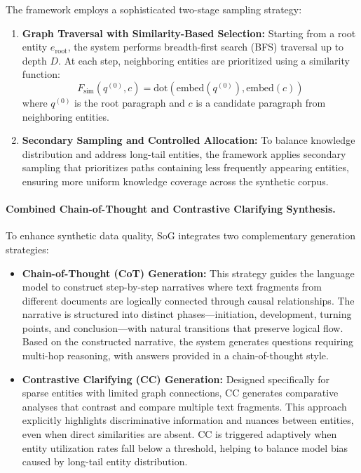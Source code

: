 \documentclass[11pt,a4paper]{article}
\begin{document}
The framework employs a sophisticated two-stage sampling strategy:
\begin{enumerate}
    \item \textbf{Graph Traversal with Similarity-Based Selection:} Starting from a root entity $e_{\text{root}}$, the system performs breadth-first search (BFS) traversal up to depth $D$. At each step, neighboring entities are prioritized using a similarity function:
    \begin{equation}
    F_{\text{sim}}(q^{(0)}, c) = \text{dot}(\text{embed}(q^{(0)}), \text{embed}(c))
    \end{equation}
    where $q^{(0)}$ is the root paragraph and $c$ is a candidate paragraph from neighboring entities.
    
    \item \textbf{Secondary Sampling and Controlled Allocation:} To balance knowledge distribution and address long-tail entities, the framework applies secondary sampling that prioritizes paths containing less frequently appearing entities, ensuring more uniform knowledge coverage across the synthetic corpus.
\end{enumerate}

\paragraph{Combined Chain-of-Thought and Contrastive Clarifying Synthesis.}
To enhance synthetic data quality, SoG integrates two complementary generation strategies:

\begin{itemize}
    \item \textbf{Chain-of-Thought (CoT) Generation:} This strategy guides the language model to construct step-by-step narratives where text fragments from different documents are logically connected through causal relationships. The narrative is structured into distinct phases—initiation, development, turning points, and conclusion—with natural transitions that preserve logical flow. Based on the constructed narrative, the system generates questions requiring multi-hop reasoning, with answers provided in a chain-of-thought style.
    
    \item \textbf{Contrastive Clarifying (CC) Generation:} Designed specifically for sparse entities with limited graph connections, CC generates comparative analyses that contrast and compare multiple text fragments. This approach explicitly highlights discriminative information and nuances between entities, even when direct similarities are absent. CC is triggered adaptively when entity utilization rates fall below a threshold, helping to balance model bias caused by long-tail entity distribution.
\end{itemize}
\end{document}
